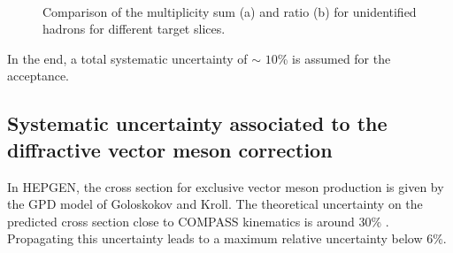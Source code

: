 \begin{figure}[!h]
  \centering
	 \\
	\caption{Comparison of the multiplicity sum (a) and ratio (b) for unidentified hadrons for different target slices.}
	\label{pic:Zvertexsum}
\end{figure}

In the end, a total systematic uncertainty of $\sim$ $10$\% is assumed for the acceptance.


\subsection{Systematic uncertainty associated to the diffractive vector meson correction}

In HEPGEN, the cross section for exclusive vector meson production is given by the GPD model of Goloskokov and Kroll. The theoretical uncertainty on the predicted cross section close to COMPASS kinematics is around $30$\% \cite{Goloskokov}. Propagating this uncertainty leads to a maximum relative uncertainty below $6$\%.

